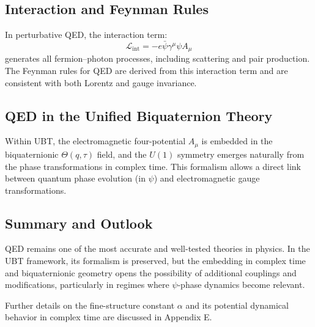 \subsection*{Interaction and Feynman Rules}
In perturbative QED, the interaction term:
\begin{equation}
\mathcal{L}_{\text{int}} = -e \bar{\psi} \gamma^\mu \psi A_\mu
\end{equation}
generates all fermion–photon processes, including scattering and pair production. The 
Feynman rules for QED are derived from this interaction term and are consistent with both Lorentz and gauge invariance.

\subsection*{QED in the Unified Biquaternion Theory}
Within UBT, the electromagnetic four-potential $A_\mu$ is embedded in the biquaternionic $\Theta(q,\tau)$ field, 
and the $U(1)$ symmetry emerges naturally from the phase transformations in complex time. This formalism allows 
a direct link between quantum phase evolution (in $\psi$) and electromagnetic gauge transformations.

\subsection*{Summary and Outlook}
QED remains one of the most accurate and well-tested theories in physics. In the UBT framework, 
its formalism is preserved, but the embedding in complex time and biquaternionic geometry opens the 
possibility of additional couplings and modifications, particularly in regimes where $\psi$-phase dynamics become relevant.

Further details on the fine-structure constant $\alpha$ and its potential dynamical behavior in complex time 
are discussed in Appendix E.
